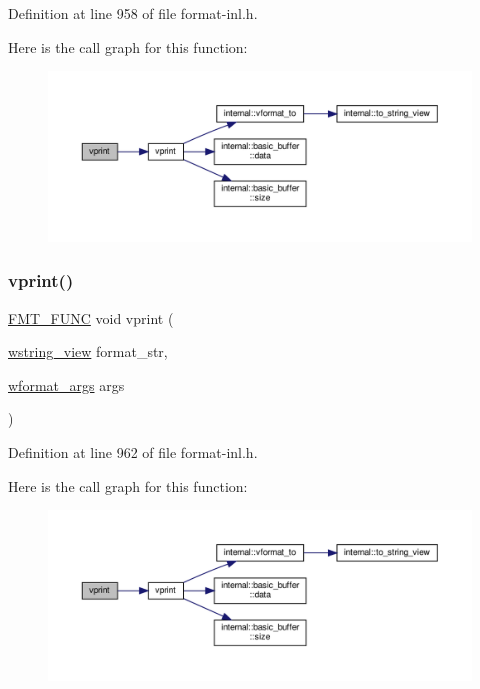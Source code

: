 Definition at line 958 of file format-\/inl.\+h.

Here is the call graph for this function\+:
\nopagebreak
\begin{figure}[H]
\begin{center}
\leavevmode
\includegraphics[width=350pt]{format-inl_8h_a77fcf4959d4c69c3800b759696f37248_cgraph}
\end{center}
\end{figure}
\mbox{\label{format-inl_8h_aeba80e7dd0c0541ae25553f1627a55e1}} 
\subsubsection{\texorpdfstring{vprint()}{vprint()}\hspace{0.1cm}{\footnotesize\ttfamily [4/4]}}
{\footnotesize\ttfamily \hyperlink{format_8h_a02c8898388e0ae59aab58be14fcd4e05}{F\+M\+T\+\_\+\+F\+U\+NC} void vprint (\begin{DoxyParamCaption}\item[{\hyperlink{core_8h_ad7c259380697a46ef799332f3ded429e}{wstring\+\_\+view}}]{format\+\_\+str,  }\item[{\hyperlink{structwformat__args}{wformat\+\_\+args}}]{args }\end{DoxyParamCaption})}



Definition at line 962 of file format-\/inl.\+h.

Here is the call graph for this function\+:
\nopagebreak
\begin{figure}[H]
\begin{center}
\leavevmode
\includegraphics[width=350pt]{format-inl_8h_aeba80e7dd0c0541ae25553f1627a55e1_cgraph}
\end{center}
\end{figure}
